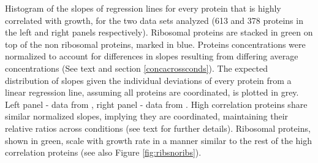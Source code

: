 \label{fig:globalfit}
    Histogram of the slopes of regression lines for every protein that is highly correlated with growth, for the two data sets analyzed (613 and 378 proteins in the left and right panels respectively).
    Ribosomal proteins are stacked in green on top of the non ribosomal proteins, marked in blue.
    Proteins concentrations were normalized to account for differences in slopes resulting from differing average concentrations (See text and section \ref{concacrossconds}).
    The expected distribution of slopes given the individual deviations of every protein from a linear regression line, assuming all proteins are coordinated, is plotted in grey.
    Left panel - data from \cite{Heinemann2015}, right panel - data from \cite{Valgepea2013}.
    High correlation proteins share similar normalized slopes, implying they are coordinated, maintaining their relative ratios across conditions (see text for further details).
    Ribosomal proteins, shown in green, scale with growth rate in a manner similar to the rest of the high correlation proteins (see also Figure \ref{fig:ribsnoribs}).
